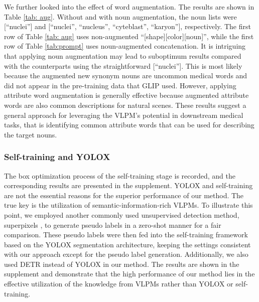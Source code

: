 \documentclass[runningheads]{llncs}
\begin{document}
We further looked into the effect of word augmentation. The results are shown in Table \ref{tab: aug}. Without and with noun augmentation, the noun lists were [``nuclei''] and [``nuclei'', ``nucleus'', ``cyteblast'', ``karyon''], respectively. The first row of Table \ref{tab: aug} uses non-augmented ``[shape][color][noun]'', while the first row of Table \ref{tab:prompt} uses noun-augmented concatenation. It is intriguing that applying noun augmentation may lead to suboptimum results compared with the counterparts using the straightforward [``nuclei'']. This is most likely because the augmented new synonym nouns are uncommon medical words and did not appear in the pre-training data that GLIP used. However, applying attribute word augmentation is generally effective because augmented attribute words are also common descriptions for natural scenes. These results suggest a general approach for leveraging the VLPM's potential in downstream medical tasks, that is identifying common attribute words that can be used for describing the target nouns.

\subsubsection{Self-training and YOLOX}
The box optimization process of the self-training stage is recorded, and the corresponding results are presented in the supplement. YOLOX and self-training are not the essential reasons for the superior performance of our method. The true key is the utilization of semantic-information-rich VLPMs. To illustrate this point, we employed another commonly used unsupervised detection method, superpixels \cite{achanta2012slic}, to generate pseudo labels in a zero-shot manner for a fair comparison. These pseudo labels were then fed into the self-training framework based on the YOLOX segmentation architecture, keeping the settings consistent with our approach except for the pseudo label generation. Additionally, we also used DETR \cite{carion2020end} instead of YOLOX in our method. The results are shown in the supplement and demonstrate that the high performance of our method lies in the effective utilization of the knowledge from VLPMs rather than YOLOX or self-training.

\end{document}
